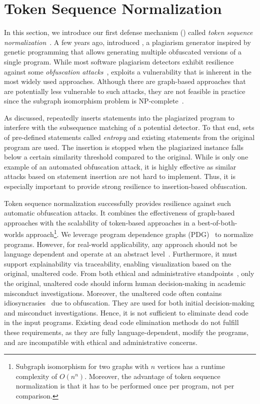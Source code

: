 \section{Token Sequence Normalization}\label{sec:tsn}

In this section, we introduce our first defense mechanism () called \textit{token sequence normalization}~\cite{Saglam2024b}.
A few years ago, \citet{DevoreMcDonald2020} introduced \textit{\mossad}, a plagiarism generator inspired by genetic programming that allows generating multiple obfuscated versions of a single program.
While most software plagiarism detectors exhibit resilience against some \textit{obfuscation attacks}~\cite{Joy1999,prechelt2000}, \mossad exploits a vulnerability that is inherent in the most widely used approaches.
Although there are graph-based approaches that are potentially less vulnerable to such attacks, they are not feasible in practice~\cite{liu2006} since the subgraph isomorphism problem is NP-complete~\cite{Shang2008, McCreesh2020, Lubiw1981}.

As discussed, \mossad repeatedly inserts statements into the plagiarized program to interfere with the subsequence matching of a potential detector.
To that end, sets of pre-defined statements called \textit{entropy} and existing statements from the original program are used.
The insertion is stopped when the plagiarized instance falls below a certain similarity threshold compared to the original.
%
While \mossad is only one example of an automated obfuscation attack, it is highly effective as similar attacks based on statement insertion are not hard to implement. Thus, it is especially important to provide strong resilience to insertion-based obfuscation.

Token sequence normalization successfully provides resilience against such automatic obfuscation attacks.
It combines the effectiveness of graph-based approaches with the scalability of token-based approaches in a best-of-both-worlds approach\footnote{Subgraph isomorphism for two graphs with $n$ vertices has a runtime complexity of $O(n^n)$. Moreover, the advantage of token sequence normalization is that it has to be performed once per program, not per comparison.}.
We leverage program dependence graphs (PDG)~\cite{ferrante1987} to normalize programs.
However, for real-world applicability, any approach should not be language dependent and operate at an abstract level~\cite{prechelt2002, liu2006, Nichols2019}. Furthermore, it must support explainability via traceability, enabling visualization based on the original, unaltered code.
From both ethical and administrative standpoints~\cite{Simon2016, Le2013}, only the original, unaltered code should inform human decision-making in academic misconduct investigations.
Moreover, the unaltered code often contains idiosyncrasies~\cite{Novak2019} due to obfuscation. They are used for both initial decision-making and misconduct investigations.
Hence, it is not sufficient to eliminate dead code in the input programs.
Existing dead code elimination methods do not fulfill these requirements, as they are fully language-dependent, modify the programs, and are incompatible with ethical and administrative concerns.

